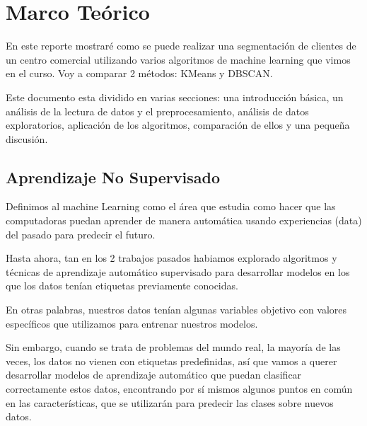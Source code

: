 \documentclass[12pt, fleqn]{report}                             %
\theoremstyle{break}                                            %
\begin{document}
\restoregeometry                                                    %
\nopagecolor                                                        %




\tableofcontents{}
\label{sec:Index}

\clearpage


\part{Marco Teórico}
\clearpage

    En este reporte mostraré como se puede realizar una segmentación de clientes de 
    un centro comercial utilizando varios algoritmos de machine learning que vimos en el 
    curso. Voy a comparar 2 métodos: KMeans y DBSCAN.

    Este documento esta dividido en varias secciones: una introducción básica, un análisis 
    de la lectura de datos y el preprocesamiento, análisis de datos exploratorios, aplicación 
    de los algoritmos, comparación de ellos y una pequeña discusión.

    \chapter{Aprendizaje No Supervisado}
        Definimos al machine Learning como el área que estudia como hacer que las computadoras puedan
        aprender de manera automática usando experiencias (data) del pasado para predecir el futuro.

        Hasta ahora, tan en los 2 trabajos pasados habiamos explorado algoritmos y técnicas de aprendizaje 
        automático supervisado para desarrollar modelos en los que los datos tenían etiquetas previamente 
        conocidas. 
        
        En otras palabras, nuestros datos tenían algunas variables objetivo con valores específicos que 
        utilizamos para entrenar nuestros modelos.

        Sin embargo, cuando se trata de problemas del mundo real, la mayoría de las veces, 
        los datos no vienen con etiquetas predefinidas, así que vamos a querer desarrollar 
        modelos de aprendizaje automático que puedan clasificar correctamente estos datos, encontrando 
        por sí mismos algunos puntos en común en las características, que se utilizarán para 
        predecir las clases sobre nuevos datos.
    
\end{document}
